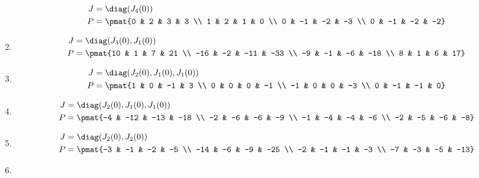 \begin{enumerate}
\begin{align*}
J &= \diag(J_{4}(0))\\
P &= \pmat{0 & 2 & 3 & 3 \\ 1 & 2 & 1 & 0 \\ 0 & -1 & -2 & -3 \\ 0 & -1 & -2 & -2}
\end{align*}

\item

\begin{align*}
J &= \diag(J_{3}(0), J_{1}(0))\\
P &= \pmat{10 & 1 & 7 & 21 \\ -16 & -2 & -11 & -33 \\ -9 & -1 & -6 & -18 \\ 8 & 1 & 6 & 17}
\end{align*}

\item

\begin{align*}
J &= \diag(J_{2}(0), J_{1}(0), J_{1}(0))\\
P &= \pmat{1 & 0 & -1 & 3 \\ 0 & 0 & 0 & -1 \\ -1 & 0 & 0 & -3 \\ 0 & -1 & -1 & 0}
\end{align*}

\item

\begin{align*}
J &= \diag(J_{2}(0), J_{1}(0), J_{1}(0))\\
P &= \pmat{-4 & -12 & -13 & -18 \\ -2 & -6 & -6 & -9 \\ -1 & -4 & -4 & -6 \\ -2 & -5 & -6 & -8}
\end{align*}

\item

\begin{align*}
J &= \diag(J_{2}(0), J_{2}(0))\\
P &= \pmat{-3 & -1 & -2 & -5 \\ -14 & -6 & -9 & -25 \\ -2 & -1 & -1 & -3 \\ -7 & -3 & -5 & -13}
\end{align*}

\item


\end{enumerate}
